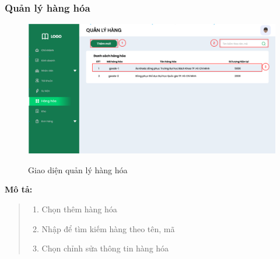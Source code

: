     
    \subsubsection{Quản lý hàng hóa}
        \begin{figure}[!htp]
            \centering
            \includegraphics[width=12cm]{img/UI/admin/Goods.png}
            \label{37}
            \newline
            \caption{Giao diện quản lý hàng hóa}
        \end{figure}
        \textbf{Mô tả:}  
        \begin{quote}
            \begin{enumerate}
                \item Chọn thêm hàng hóa
                \item Nhập để tìm kiếm hàng theo tên, mã
                \item Chọn chỉnh sửa thông tin hàng hóa
            \end{enumerate}
        \end{quote}
        
        \newpage

